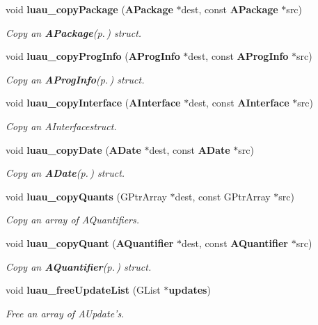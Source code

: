 \begin{CompactItemize}
void {\bf luau\_\-copy\-Package} ({\bf APackage} $\ast$dest, const {\bf APackage} $\ast$src)
\begin{CompactList}\small\item\em Copy an {\bf APackage}{\rm (p.\,\pageref{structAPackage})} struct. \item\end{CompactList}\item 
void {\bf luau\_\-copy\-Prog\-Info} ({\bf AProg\-Info} $\ast$dest, const {\bf AProg\-Info} $\ast$src)
\begin{CompactList}\small\item\em Copy an {\bf AProg\-Info}{\rm (p.\,\pageref{structAProgInfo})} struct. \item\end{CompactList}\item 
void {\bf luau\_\-copy\-Interface} ({\bf AInterface} $\ast$dest, const {\bf AInterface} $\ast$src)
\begin{CompactList}\small\item\em Copy an AInterfacestruct. \item\end{CompactList}\item 
void {\bf luau\_\-copy\-Date} ({\bf ADate} $\ast$dest, const {\bf ADate} $\ast$src)
\begin{CompactList}\small\item\em Copy an {\bf ADate}{\rm (p.\,\pageref{structADate})} struct. \item\end{CompactList}\item 
void {\bf luau\_\-copy\-Quants} (GPtr\-Array $\ast$dest, const GPtr\-Array $\ast$src)
\begin{CompactList}\small\item\em Copy an array of AQuantifiers. \item\end{CompactList}\item 
void {\bf luau\_\-copy\-Quant} ({\bf AQuantifier} $\ast$dest, const {\bf AQuantifier} $\ast$src)
\begin{CompactList}\small\item\em Copy an {\bf AQuantifier}{\rm (p.\,\pageref{structAQuantifier})} struct. \item\end{CompactList}\item 
void {\bf luau\_\-free\-Update\-List} (GList $\ast${\bf updates})
\begin{CompactList}\small\item\em Free an array of AUpdate's. \item\end{CompactList}\item 

\end{CompactItemize}
